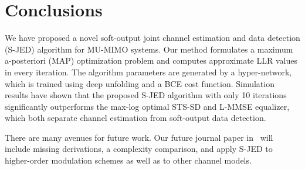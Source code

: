 \documentclass[conference,10pt,twocolumn]{IEEEtran}
\begin{document}







\section{Conclusions}
  
We have proposed a novel soft-output joint channel estimation and data detection (S-JED) algorithm for MU-MIMO systems.
%
Our method formulates a maximum a-posteriori (MAP) optimization problem and computes approximate LLR values in every iteration. 
%
The algorithm parameters are generated by a hyper-network, which is trained using deep unfolding and a BCE cost function. 
%
Simulation results have shown that the proposed S-JED algorithm with only 10 iterations significantly outperforms the max-log optimal STS-SD and L-MMSE equalizer, which both separate channel estimation from soft-output data detection. 

There are many avenues for future work. Our future journal paper in~\cite{songSJEDfuture} will include missing derivations, a complexity comparison, and apply S-JED to higher-order modulation schemes as well as to other channel models. 

 

\balance


\balance
\end{document}

